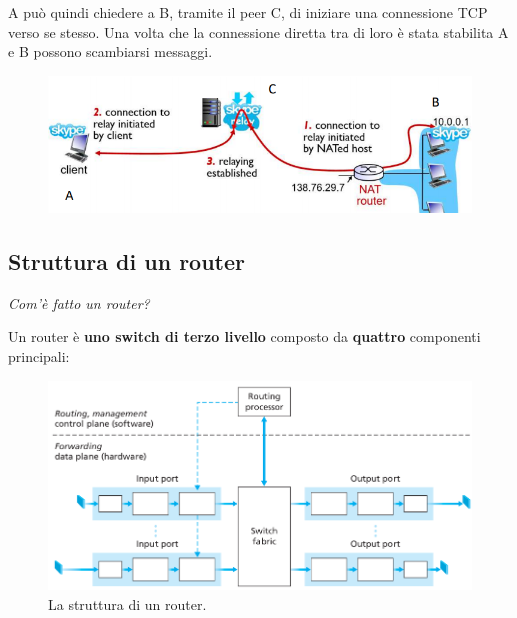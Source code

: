 \documentclass[11pt,a4paper,oneside]{book}
\theoremstyle{definition}
\begin{document}
\begin{enumerate}
\begin{enumerate}
		            A può quindi chiedere a B, tramite il peer C, di iniziare una connessione TCP verso se stesso. Una volta che la connessione diretta tra di loro è stata stabilita A e B possono scambiarsi messaggi.

		            \begin{figure}[!h]
			            \includegraphics[scale=0.5]{Immagini/Natp3.png}
			            \centering
		            \end{figure}
	      \end{enumerate}

	      \pagebreak


\end{enumerate}

\pagebreak

\subsection{Struttura di un router}
\begin{flushleft}
	\textit{Com'è fatto un router?}
\end{flushleft}

Un router è \textbf{uno switch di terzo livello} composto da \textbf{quattro} componenti principali:

\begin{figure}[!h]
	\includegraphics[scale=0.5]{Immagini/Router_struc.png}
	\centering
	\caption{La struttura di un router.}
\end{figure}
\end{document}
